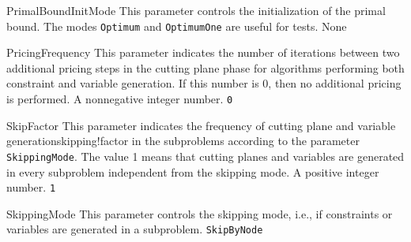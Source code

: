 \parameter
{PrimalBoundInitMode}
{This parameter controls the initialization of the primal 
 bound.
 The modes {\tt Optimum} and {\tt OptimumOne} are useful for tests.}
{
}
{None}

\parameter
{PricingFrequency}
{This parameter indicates the number of iterations between two additional
 pricing steps
 in the cutting plane phase for algorithms performing
 both constraint and variable generation.
 If this number is 0, then no additional pricing is performed.
}
{A nonnegative integer number.}
{{\tt 0}}

\parameter
{SkipFactor}
{This parameter indicates the frequency of cutting plane and variable
 generation{skipping!factor}
 in the subproblems according to the parameter {\tt SkippingMode}. 
 The value 1 means
 that cutting planes and variables are generated in every subproblem
 independent from the skipping mode.
}
{A positive integer number.}
{{\tt 1}}

\parameter
{SkippingMode}
{This parameter controls the skipping mode, 
 i.e., if constraints or
 variables are generated in a subproblem.
}
{
}
{{\tt SkipByNode}}


